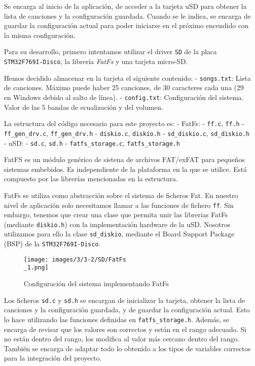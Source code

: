 Se encarga al inicio de la aplicación, de acceder a la tarjeta uSD para obtener la lista de canciones y la configuración guardada. Cuando se le indica, se encarga de guardar la configuración actual para poder iniciarse en el próximo encendido con la misma configuración. 

Para su desarrollo, primero intentamos utilizar el driver \texttt{SD} de la placa \texttt{STM32F769I-Disco}, la librería \textit{FatFs} \cite{FatFsModuleApplication}\cite{FatFsGenericFAT} y una tarjeta micro-SD.

Hemos decidido almacenar en la tarjeta el siguiente contenido:
- \texttt{songs.txt}: Lista de canciones. Máximo puede haber 25 canciones, de 30 caracteres cada una (29 en Windows debido al salto de línea). 
- \texttt{config.txt}: Configuración del sistema. Valor de las 5 bandas de ecualización y del volumen.


La estructura del código necesario para este proyecto es:
- FatFs:
	- \texttt{ff.c}, \texttt{ff.h}
	- \texttt{ff\_gen\_drv.c}, \texttt{ff\_gen\_drv.h}
	- \texttt{diskio.c}, \texttt{diskio.h}
	- \texttt{sd\_diskio.c}, \texttt{sd\_diskio.h}
- uSD:
	- \texttt{sd.c}, \texttt{sd.h}
	- \texttt{fatfs\_storage.c}, \texttt{fatfs\_storage.h}

FatFS es un módulo genérico de sistena de archivos FAT/exFAT para pequeños sistemas embebidos. Es independiente de la plataforma en la que se utilice. Está compuesto por las librerías mencionadas en la estructura.

FatFs se utiliza como abstracción sobre el sistema de ficheros Fat. En nuestro nivel de aplicación solo necesitamos llamar a las funciones de fichero \texttt{ff}. Sin embargo, tenemos que crear una clase que permita unir las librerias FatFs (mediante \texttt{diskio.h}) con la implementación hardware de la uSD. Nosotros utilizamos para ello la clase \texttt{sd\_diskio}, mediante el Board Support Package (BSP) de la \texttt{STM32F769I-Disco}.

\begin{figure}[h]
    \centering
    \texttt{[image: images/3/3-2/SD/FatFs\\\_1.png]}
    \caption{Configuración del sistema implementando FatFs}
    \label{fig:sistema-fatfs}
\end{figure}

Los ficheros \texttt{sd.c} y \texttt{sd.h} se encargan de inicializar la tarjeta, obtener la lista de canciones y la configuración guardada, y de guardar la configuración actual. Esto lo hace utilizando las funciones definidas en \texttt{fatfs\_storage.h}. Además, se encarga de revisar que los valores son correctos y están en el rango adecuado. Si no están dentro del rango, los modifica al valor más cercano dentro del rango. También se encarga de adaptar todo lo obtenido a los tipos de variables correctos para la integración del proyecto.


